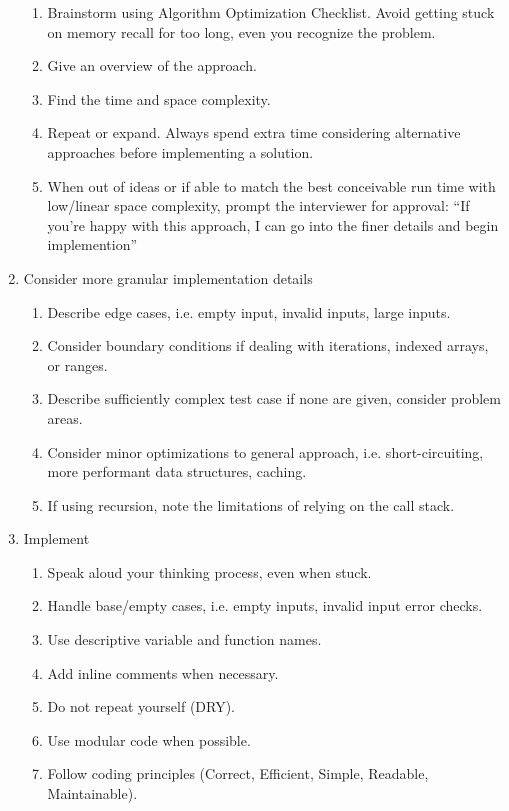 \documentclass{article}
\begin{document}
\begin{enumerate}
    \begin{enumerate}
        \item Brainstorm using Algorithm Optimization Checklist. Avoid getting stuck on memory recall for too long, even you recognize the problem.
        \item Give an overview of the approach.
        \item Find the time and space complexity.
        \item Repeat or expand. Always spend extra time considering alternative approaches before implementing a solution.
        \item When out of ideas or if able to match the best conceivable run time with low/linear space complexity, prompt the interviewer for approval: ``If you're happy with this approach, I can go into the finer details and begin implemention''
    \end{enumerate}
    
     \item Consider more granular implementation details

    \begin{enumerate}
        \item Describe edge cases, i.e. empty input, invalid inputs, large inputs.
        \item Consider boundary conditions if dealing with iterations, indexed arrays, or ranges.
        \item Describe sufficiently complex test case if none are given, consider problem areas.
        \item Consider minor optimizations to general approach, i.e. short-circuiting, more performant data structures, caching.
        \item If using recursion, note the limitations of relying on the call stack.
    \end{enumerate}
    
    \item Implement
    \begin{enumerate}
        \item Speak aloud your thinking process, even when stuck.
        \item Handle base/empty cases, i.e. empty inputs, invalid input error checks.
        \item Use descriptive variable and function names.
        \item Add inline comments when necessary.
        \item Do not repeat yourself (DRY).
        \item Use modular code when possible.
        \item Follow coding principles (Correct, Efficient, Simple, Readable, Maintainable).
    \end{enumerate}
    

\end{enumerate}
\end{document}

